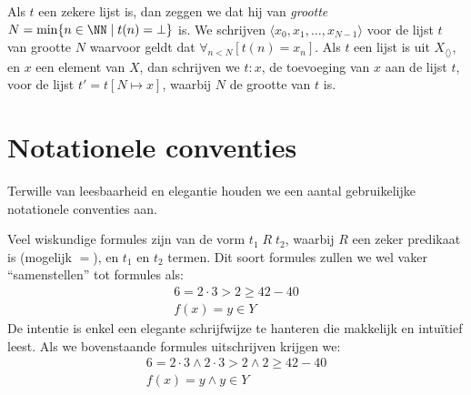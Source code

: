 Als $t$ een zekere lijst is, dan zeggen we dat hij van \emph{grootte} $N = \min\{n\in\NN \mid t(n) = \bot\}$ is.
We schrijven $\langle x_0, x_1, \dots, x_{N-1}\rangle$ voor de lijst $t$ van grootte $N$ waarvoor geldt dat $\forall_{n < N}[t(n) = x_n]$.
Als $t$ een lijst is uit $X_{\langle\rangle}$, en $x$ een element van $X$, dan schrijven we $t:x$, de toevoeging van $x$ aan de lijst $t$, voor de lijst $t' = t[N \mapsto x]$, waarbij $N$ de grootte van $t$ is.

\section{Notationele conventies}

Terwille van leesbaarheid en elegantie houden we een aantal gebruikelijke notationele conventies aan.

Veel wiskundige formules zijn van de vorm $t_1\; R\; t_2$, waarbij $R$ een zeker predikaat is (mogelijk $=$), en $t_1$ en $t_2$ termen. Dit soort formules zullen we wel vaker “samenstellen” tot formules als:
\begin{gather*}
  6 = 2 \cdot 3 > 2 \ge 42 - 40 \\
  f(x) = y \in Y
\end{gather*}
De intentie is enkel een elegante schrijfwijze te hanteren die makkelijk en intuïtief leest.
Als we bovenstaande formules uitschrijven krijgen we:
\begin{gather*}
  6 = 2 \cdot 3 \land 2 \cdot 3 > 2 \land 2 \ge 42 - 40 \\
  f(x) = y \land y \in Y
\end{gather*}

